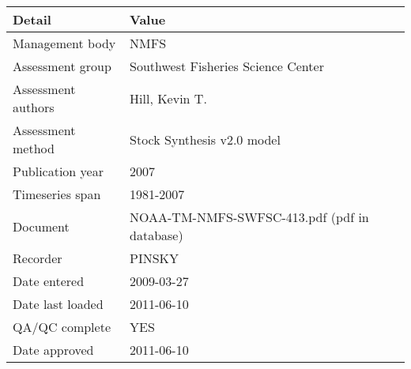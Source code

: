 \begin{table}[htb]
\centering
\begin{tabular}{lp{7cm}}
\toprule
Detail & Value \\
\midrule
Management body    & NMFS                                         \\
Assessment group   & Southwest Fisheries Science Center           \\
Assessment authors & Hill, Kevin T.                               \\
Assessment method  & Stock Synthesis v2.0 model                   \\
Publication year   & 2007                                         \\
Timeseries span    & 1981-2007                                    \\
Document           & NOAA-TM-NMFS-SWFSC-413.pdf (pdf in database) \\
Recorder           & PINSKY                                       \\
Date entered       & 2009-03-27                                   \\
Date last loaded   & 2011-06-10                                   \\
QA/QC complete     & YES                                          \\
Date approved      & 2011-06-10                                   \\
\bottomrule
\end{tabular}
\label{tab:assessdet}
\end{table}
